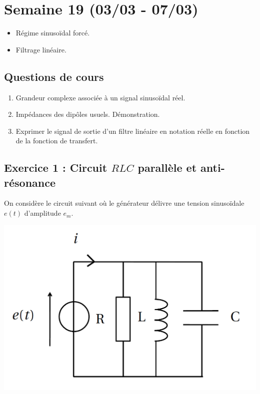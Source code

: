 \section{Semaine 19 (03/03 - 07/03) }


\begin{itemize}
	\item Régime sinusoïdal forcé.
	\item Filtrage linéaire.
\end{itemize}

\subsection{Questions de cours}

\begin{enumerate}
	\item Grandeur complexe associée à un signal sinusoïdal réel.
	\item Impédances des dipôles usuels. Démonstration.
	\item Exprimer le signal de sortie d'un filtre linéaire en notation réelle en fonction de la fonction de transfert.
\end{enumerate}

\subsection{Exercice 1 : Circuit $RLC$ parallèle et anti-résonance}

On considère le circuit suivant où le générateur délivre une tension sinusoïdale $e(t)$ d'amplitude $e_m$.

\includegraphics[width = \textwidth]{./Images/mpsi_s19_ex01.png}


